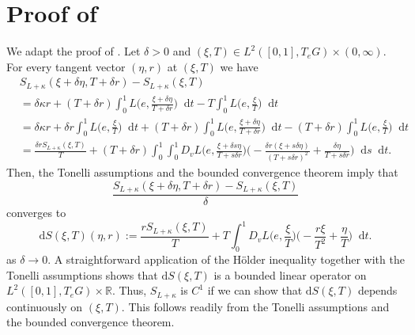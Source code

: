 \documentclass[11pt,reqno]{amsart}
\theoremstyle{plain}
\theoremstyle{definition}
\theoremstyle{plain} %
\theoremstyle{definition} %
\numberwithin{equation}{section}
\begin{document}
\section{Proof of }\label{s: proof of reg lemma}
    We adapt the proof of \cite[Prop.\ 3.1]{AbbondandoloSchwarz2009}. Let \( \delta > 0 \) and \( (\xi, T) \in L^2([0, 1], T_eG) \times (0, \infty) \). For every tangent vector \( (\eta, r) \) at \( (\xi, T) \) we have
    \begin{equation*}
        \begin{aligned}
            &S_ {L + \kappa} (\xi + \delta \eta, T + \delta r) - S_{L + \kappa}(\xi, T) \\
            &= \delta \kappa r + (T + \delta r) \int_0^1 L\bigg( e, \frac{\xi + \delta \eta}{T + \delta r} \bigg) \mathop{}\!\mathrm{d}t - T \int_0^1 L\bigg( e, \frac{\xi}{T} \bigg) \mathop{}\!\mathrm{d}t \\
            &= \delta \kappa r + \delta r \int_0^1 L\bigg( e, \frac{\xi}{T} \bigg) \mathop{}\!\mathrm{d}t + (T + \delta r) \int_0^1 L\bigg( e, \frac{\xi + \delta \eta}{T + \delta r} \bigg) \mathop{}\!\mathrm{d}t - (T + \delta r) \int_0^1 L\bigg( e, \frac{\xi}{T} \bigg) \mathop{}\!\mathrm{d}t \\
            &= \frac{\delta r S_{L + \kappa}(\xi, T)}{T} + (T + \delta r) \int_0^1 \int_0^1 D_vL \bigg(e, \frac{\xi + \delta s \eta}{T + s \delta r} \bigg) \bigg( -\frac{\delta r(\xi + s \delta \eta)}{(T + s \delta r)^2}  + \frac{\delta \eta}{T + s \delta r} \bigg) \mathop{}\!\mathrm{d}s \mathop{}\!\mathrm{d}t.
        \end{aligned}
    \end{equation*}
    Then, the Tonelli assumptions and the bounded convergence theorem imply that
    \begin{equation*}
        \frac{S_{L + \kappa}(\xi + \delta \eta, T + \delta r) - S_{L + \kappa}(\xi, T)}{\delta}
    \end{equation*}
    converges to 
    \begin{equation}\label{eq:diff_action}
        \mathrm d S(\xi, T)(\eta, r) := \frac{r S_{L + \kappa}(\xi, T)}{T} + T \int_0^1 D_vL \bigg( e, \frac{\xi}{T} \bigg) \bigg( -\frac{r\xi}{T^2} + \frac{\eta}{T} \bigg) \mathop{}\!\mathrm{d}t.
    \end{equation}
    as \( \delta \to 0 \).
    A straightforward application of the H\"older inequality together with the Tonelli assumptions shows that \( \mathrm d S(\xi, T) \) is a bounded linear operator on \( L^2([0, 1], T_eG) \times \mathbb R \). Thus, \( S_{L + \kappa} \) is \( C^1 \) if we can show that \( \mathrm d S (\xi, T) \) depends continuously on \( (\xi, T) \). This follows readily from the Tonelli assumptions and the bounded convergence theorem.
\end{document}
